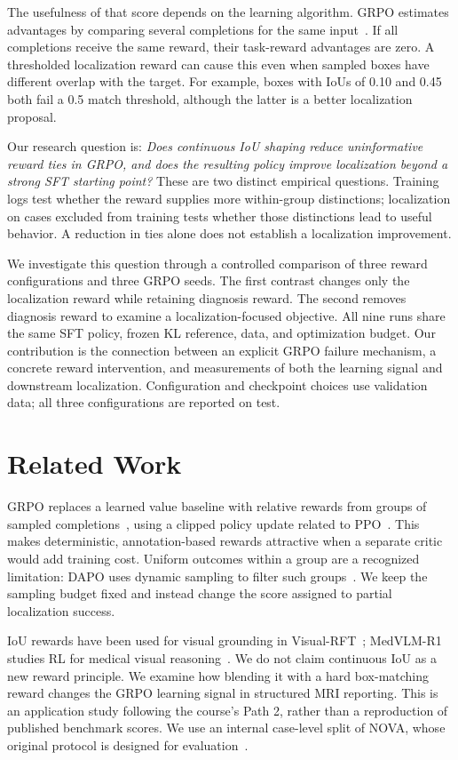 \documentclass[conference]{IEEEtran}
\begin{document}
The usefulness of that score depends on the learning algorithm. GRPO estimates advantages by comparing several completions for the same input~\cite{grpo}. If all completions receive the same reward, their task-reward advantages are zero. A thresholded localization reward can cause this even when sampled boxes have different overlap with the target. For example, boxes with IoUs of 0.10 and 0.45 both fail a 0.5 match threshold, although the latter is a better localization proposal.

Our research question is: \emph{Does continuous IoU shaping reduce uninformative reward ties in GRPO, and does the resulting policy improve localization beyond a strong SFT starting point?} These are two distinct empirical questions. Training logs test whether the reward supplies more within-group distinctions; localization on cases excluded from training tests whether those distinctions lead to useful behavior. A reduction in ties alone does not establish a localization improvement.

We investigate this question through a controlled comparison of three reward configurations and three GRPO seeds. The first contrast changes only the localization reward while retaining diagnosis reward. The second removes diagnosis reward to examine a localization-focused objective. All nine runs share the same SFT policy, frozen KL reference, data, and optimization budget. Our contribution is the connection between an explicit GRPO failure mechanism, a concrete reward intervention, and measurements of both the learning signal and downstream localization. Configuration and checkpoint choices use validation data; all three configurations are reported on test.

\section{Related Work}
GRPO replaces a learned value baseline with relative rewards from groups of sampled completions~\cite{grpo}, using a clipped policy update related to PPO~\cite{ppo}. This makes deterministic, annotation-based rewards attractive when a separate critic would add training cost. Uniform outcomes within a group are a recognized limitation: DAPO uses dynamic sampling to filter such groups~\cite{dapo}. We keep the sampling budget fixed and instead change the score assigned to partial localization success.

IoU rewards have been used for visual grounding in Visual-RFT~\cite{visualrft}; MedVLM-R1 studies RL for medical visual reasoning~\cite{medvlmr1}. We do not claim continuous IoU as a new reward principle. We examine how blending it with a hard box-matching reward changes the GRPO learning signal in structured MRI reporting. This is an application study following the course's Path 2, rather than a reproduction of published benchmark scores. We use an internal case-level split of NOVA, whose original protocol is designed for evaluation~\cite{nova}.
\end{document}
